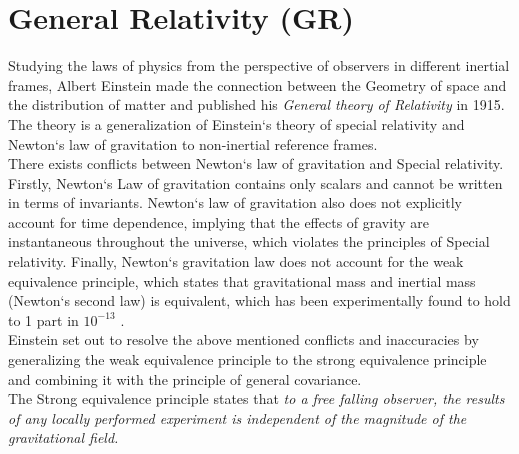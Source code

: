 \documentclass[a4paper, 11pt]{FSKH_623_Report}
\numberwithin{equation}{section}
\begin{document}
\section{General Relativity (GR)}
Studying the laws of physics from the perspective of observers in different inertial frames, Albert Einstein made the connection between the Geometry of space and the distribution of matter \citep{ITC} and published his \textit{General theory of Relativity} in 1915. The theory is a generalization of Einstein`s theory of special relativity and Newton`s law of gravitation to non-inertial reference frames.\\
There exists conflicts between Newton`s law of gravitation and Special relativity. Firstly, Newton`s Law of gravitation contains only scalars and cannot be written in terms of invariants. Newton`s law of gravitation also does not explicitly account for time dependence, implying that the effects of gravity are instantaneous throughout the universe, which violates the principles of Special relativity. Finally, Newton`s gravitation law does not account for the weak equivalence principle, which states that gravitational mass and inertial mass (Newton`s second law) is equivalent, which has been experimentally found to hold to 1 part in $10^{-13}$ \citep{EP}. \\
Einstein set out to resolve the above mentioned conflicts and inaccuracies by generalizing the weak equivalence principle to the strong equivalence principle and combining it with the principle of general covariance.\citep{ITC} \\
The Strong equivalence principle states that \textit{to a free falling observer, the results of any locally performed experiment is independent of the magnitude of the gravitational field.}\citep{GRFD, ITC}  \\
\end{document}
